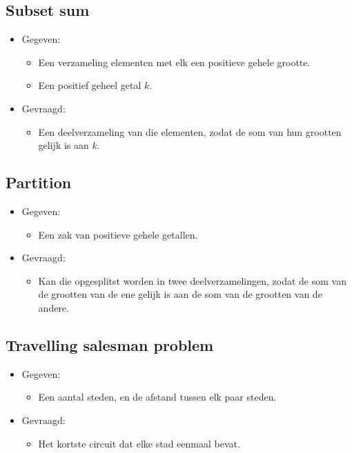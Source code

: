 \subsection{Subset sum}
\begin{itemize}
    \item Gegeven:
    \begin{itemize}
        \item Een verzameling elementen met elk een positieve gehele grootte.
        \item Een positief geheel getal $k$.
    \end{itemize}
    \item Gevraagd:
    \begin{itemize}
        \item Een deelverzameling van die elementen, zodat de som van hun grootten gelijk is aan $k$.
    \end{itemize}
\end{itemize}

\subsection{Partition}
\begin{itemize}
    \item Gegeven:
    \begin{itemize}
        \item Een zak van positieve gehele getallen.
    \end{itemize}
    \item Gevraagd:
    \begin{itemize}
        \item Kan die opgesplitst worden in twee deelverzamelingen, zodat de som van de grootten van de ene gelijk is aan de som van de grootten van de andere.
    \end{itemize}
\end{itemize}

\subsection{Travelling salesman problem}
\begin{itemize}
    \item Gegeven:
    \begin{itemize}
        \item Een aantal steden, en de afstand tussen elk paar steden.
    \end{itemize}
    \item Gevraagd:
    \begin{itemize}
        \item Het kortste circuit dat elke stad eenmaal bevat.
    \end{itemize}
\end{itemize}

